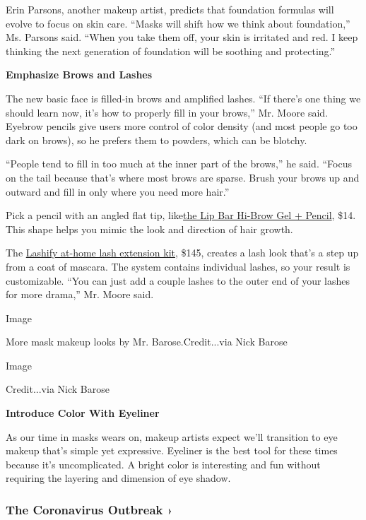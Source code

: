 Erin Parsons, another makeup artist, predicts that foundation formulas
will evolve to focus on skin care. ``Masks will shift how we think about
foundation,'' Ms. Parsons said. ``When you take them off, your skin is
irritated and red. I keep thinking the next generation of foundation
will be soothing and protecting.''

\textbf{Emphasize Brows and Lashes}

The new basic face is filled-in brows and amplified lashes. ``If there's
one thing we should learn now, it's how to properly fill in your
brows,'' Mr. Moore said. Eyebrow pencils give users more control of
color density (and most people go too dark on brows), so he prefers them
to powders, which can be blotchy.

``People tend to fill in too much at the inner part of the brows,'' he
said. ``Focus on the tail because that's where most brows are sparse.
Brush your brows up and outward and fill in only where you need more
hair.''

Pick a pencil with an angled flat tip,
like\href{https://www.thelipbar.com/products/hi-brow}{the Lip Bar
Hi-Brow Gel + Pencil}, \$14. This shape helps you mimic the look and
direction of hair growth.

The \href{https://lashify.com/}{Lashify at-home lash extension kit},
\$145, creates a lash look that's a step up from a coat of mascara. The
system contains individual lashes, so your result is customizable. ``You
can just add a couple lashes to the outer end of your lashes for more
drama,'' Mr. Moore said.

Image

More mask makeup looks by Mr. Barose.Credit...via Nick Barose

Image

Credit...via Nick Barose

\textbf{Introduce Color With Eyeliner}

As our time in masks wears on, makeup artists expect we'll transition to
eye makeup that's simple yet expressive. Eyeliner is the best tool for
these times because it's uncomplicated. A bright color is interesting
and fun without requiring the layering and dimension of eye shadow.

\href{https://www.nytimes.com/news-event/coronavirus?action=click\&pgtype=Article\&state=default\&region=MAIN_CONTENT_3\&context=storylines_faq}{}

\hypertarget{the-coronavirus-outbreak-}{%
\subsubsection{The Coronavirus Outbreak
›}\label{the-coronavirus-outbreak-}}

